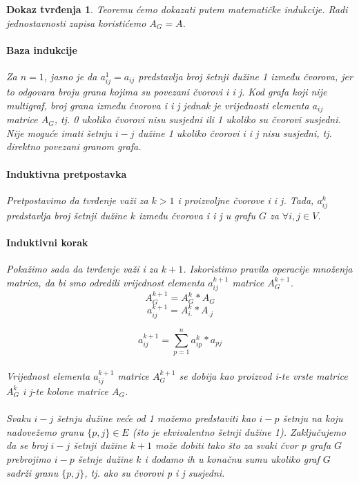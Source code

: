 \documentclass[11pt]{article}
\newtheorem*{custom_proof}{Dokaz tvrđenja}
\begin{document}
		\begin{custom_proof}
		    Teoremu ćemo dokazati putem matematičke indukcije. Radi jednostavnosti zapisa koristićemo $A_G = A$.
			
			\paragraph{Baza indukcije}
			Za $n=1$, jasno je da $a_{ij}^1 = a_{ij}$ predstavlja broj šetnji dužine 1 između čvorova, jer to odgovara broju grana kojima su povezani čvorovi i i j. 
			Kod grafa koji nije multigraf, broj grana između čvorova i i j jednak je vrijednosti elementa $a_{ij}$ matrice $A_G$, tj. 0 ukoliko čvorovi nisu susjedni ili 1 ukoliko su čvorovi susjedni. 
			Nije moguće imati šetnju $i-j$ dužine 1 ukoliko čvorovi i i j nisu susjedni, tj. direktno povezani granom grafa. 
			
			\paragraph{Induktivna pretpostavka}
			Pretpostavimo da tvrđenje važi za $k>1$ i proizvoljne čvorove i i j. Tada, $a_{ij}^k$ predstavlja broj šetnji dužine $k$ između čvorova i i j u grafu $G$ za $\forall i,j \in V$. 
			
			\paragraph{Induktivni korak}
			Pokažimo sada da tvrđenje važi i za $k+1$.
			Iskoristimo pravila operacije množenja matrica, da bi smo odredili vrijednost elementa $a_{ij}^{k+1}$ matrice $A_G^{k+1}$.  
			\[
				A_G^{k+1} = A_G^k * A_G
			\]
			\[
				a_{ij}^{k+1} = A_{i.}^k * A_{.j} 
			\]

			\begin{equation}
			a_{ij}^{k+1} = \sum_{p=1}^{n} a_{ip}^k * a_{pj}
			\label{eq:element}
			\end{equation}
		
			\paragraph{}
			Vrijednost elementa $a_{ij}^{k+1}$ matrice $A_G^{k+1}$ se dobija kao proizvod i-te vrste matrice $A_G^k$ i j-te kolone matrice $A_G$. 
			
			\paragraph{}
			Svaku $i-j$ šetnju dužine veće od 1 možemo predstaviti kao $i-p$ šetnju na koju nadovežemo granu $\{p,j\} \in E$ (što je ekvivalentno šetnji dužine 1). 
			Zaključujemo da se broj $i-j$ šetnji dužine $k+1$ može dobiti tako što za svaki čvor $p$ grafa $G$ prebrojimo $i-p$ šetnje dužine $k$ i dodamo ih u konačnu sumu ukoliko graf $G$ sadrži granu $\{p,j\}$,
			tj. ako su čvorovi p i j susjedni.
		

\end{custom_proof}
\end{document}
